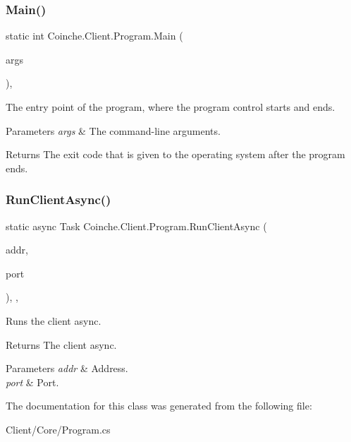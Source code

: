 \subsubsection{\texorpdfstring{Main()}{Main()}}
{\footnotesize\ttfamily static int Coinche.\+Client.\+Program.\+Main (\begin{DoxyParamCaption}\item[{String \mbox{[}$\,$\mbox{]}}]{args }\end{DoxyParamCaption})\hspace{0.3cm}{\ttfamily [inline]}, {\ttfamily [static]}}



The entry point of the program, where the program control starts and ends. 


\begin{DoxyParams}{Parameters}
{\em args} & The command-\/line arguments.\\
\hline
\end{DoxyParams}
\begin{DoxyReturn}{Returns}
The exit code that is given to the operating system after the program ends.
\end{DoxyReturn}
\mbox{\label{class_coinche_1_1_client_1_1_program_a748963e969bfd9e466f58422f39bc1b8}} 
\subsubsection{\texorpdfstring{Run\+Client\+Async()}{RunClientAsync()}}
{\footnotesize\ttfamily static async Task Coinche.\+Client.\+Program.\+Run\+Client\+Async (\begin{DoxyParamCaption}\item[{I\+P\+Address}]{addr,  }\item[{short}]{port }\end{DoxyParamCaption})\hspace{0.3cm}{\ttfamily [inline]}, {\ttfamily [static]}, {\ttfamily [private]}}



Runs the client async. 

\begin{DoxyReturn}{Returns}
The client async.
\end{DoxyReturn}

\begin{DoxyParams}{Parameters}
{\em addr} & Address.\\
\hline
{\em port} & Port.\\
\hline
\end{DoxyParams}


The documentation for this class was generated from the following file\+:\begin{DoxyCompactItemize}
\item 
Client/\+Core/Program.\+cs\end{DoxyCompactItemize}
